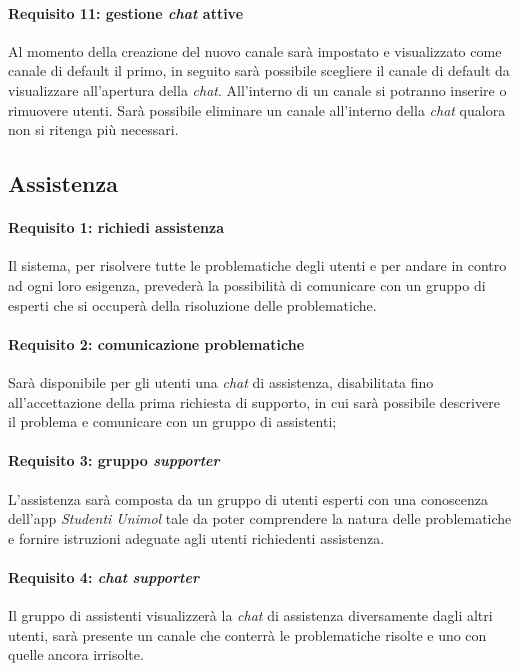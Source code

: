 \paragraph{Requisito 11: gestione \emph{chat} attive\\}
Al momento della creazione del nuovo canale sarà impostato e visualizzato come canale di default il primo, in seguito sarà possibile scegliere il canale di default da visualizzare all’apertura della \emph{chat}. All’interno di un canale si potranno inserire o rimuovere utenti. Sarà possibile eliminare un canale all’interno della \emph{chat} qualora non si ritenga più necessari.

\subsection {Assistenza}

\paragraph{Requisito 1: richiedi assistenza\\}
Il sistema, per risolvere tutte le problematiche degli utenti e per andare in contro ad ogni loro esigenza, prevederà la possibilità di comunicare con un gruppo di esperti che si occuperà della risoluzione delle problematiche.

\paragraph{Requisito 2: comunicazione problematiche\\}
Sarà disponibile per gli utenti una \emph{chat} di assistenza, disabilitata fino all’accettazione della prima richiesta di supporto, in cui sarà possibile descrivere il problema e comunicare con un gruppo di assistenti;

\paragraph{Requisito 3: gruppo \emph{supporter}\\}
L’assistenza sarà composta da un gruppo di utenti esperti con una conoscenza dell’app \emph{Studenti Unimol} tale da poter comprendere la natura delle problematiche e fornire istruzioni adeguate agli utenti richiedenti assistenza. 

\paragraph{Requisito 4: \emph{chat} \emph{supporter}\\}
Il gruppo di assistenti visualizzerà la \emph{chat} di assistenza diversamente dagli altri utenti, sarà presente un canale che conterrà le problematiche risolte e uno con quelle ancora irrisolte.


